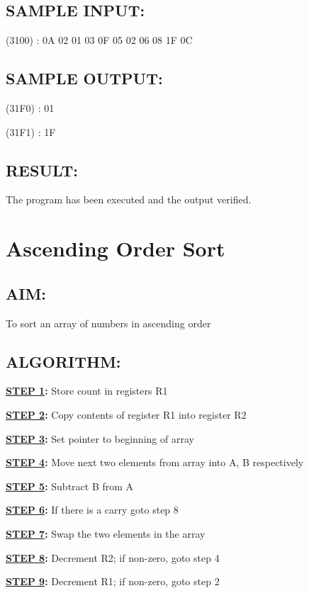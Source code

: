 \documentclass[a4paper,28pt]{report}
\begin{document}
\section*{SAMPLE INPUT:}
(3100) : 0A 02 01 03 0F 05 02 06 08 1F 0C
\section*{SAMPLE OUTPUT:}
(31F0) : 01

(31F1) : 1F
\section*{RESULT:}
The program has been executed and the output verified.
%
%
\chapter{Ascending Order Sort}
%
%
\section*{AIM:}
To sort an array of numbers in ascending order

\section*{ALGORITHM:}
\textbf{\underline{STEP 1}:} Store count in registers R1

\textbf{\underline{STEP 2}:} Copy contents of register R1 into register R2

\textbf{\underline{STEP 3}:} Set pointer to beginning of array 

\textbf{\underline{STEP 4}:} Move next two elements from array into A, B respectively

\textbf{\underline{STEP 5}:} Subtract B from A

\textbf{\underline{STEP 6}:} If there is a carry goto step 8

\textbf{\underline{STEP 7}:} Swap the two elements in the array

\textbf{\underline{STEP 8}:} Decrement R2; if non-zero, goto step 4

\textbf{\underline{STEP 9}:} Decrement R1; if non-zero, goto step 2  
\end{document}
